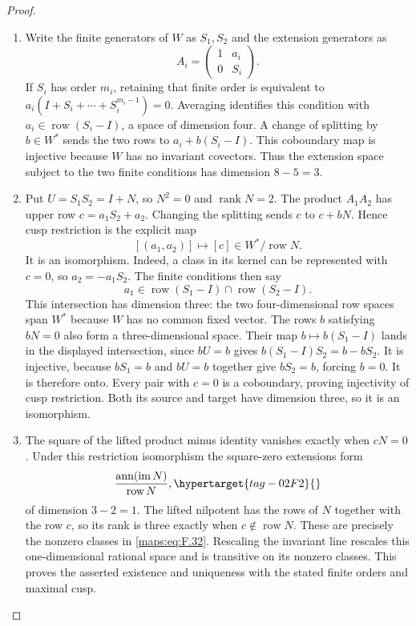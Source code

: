 \documentclass[11pt,a4paper]{article}
\numberwithin{equation}{section}
\theoremstyle{definition}
\begin{document}
\begin{proof}
\begin{enumerate}[label=\arabic*.]
\item Write the finite generators of $W$ as $S_1,S_2$ and the
extension generators as
\[
 A_i=\begin{pmatrix}1&a_i\\0&S_i\end{pmatrix}.
\]
If $S_i$ has order $m_i$, retaining that finite order is equivalent
to $a_i(I+S_i+\cdots+S_i^{m_i-1})=0$.  Averaging identifies this
condition with $a_i\in\operatorname{row}(S_i-I)$, a space of
dimension four.  A change of splitting by $b\in W^*$ sends the
two rows to $a_i+b(S_i-I)$.  This coboundary map is injective
because $W$ has no invariant covectors.  Thus the extension
space subject to the two finite conditions has dimension $8-5=3$.

\item Put $U=S_1S_2=I+N$, so $N^2=0$ and $\operatorname{rank}N=2$.
The product $A_1A_2$ has upper row $c=a_1S_2+a_2$.
Changing the splitting sends $c$ to $c+bN$.  Hence cusp restriction
is the explicit map
\[
 [(a_1,a_2)]\longmapsto[c]\in W^*/\operatorname{row}N.
\]
It is an isomorphism.  Indeed, a class in its kernel can be
represented with $c=0$, so $a_2=-a_1S_2$.  The finite conditions
then say
\[
 a_1\in\operatorname{row}(S_1-I)
              \cap\operatorname{row}(S_2-I).
\]
This intersection has dimension three: the two four-dimensional
row spaces span $W^*$ because $W$ has no common fixed vector.
The rows $b$ satisfying $bN=0$ also form a three-dimensional
space.  Their map $b\mapsto b(S_1-I)$ lands in the displayed
intersection, since $bU=b$ gives
$b(S_1-I)S_2=b-bS_2$.  It is injective, because
$bS_1=b$ and $bU=b$ together give $bS_2=b$, forcing $b=0$.
It is therefore onto.  Every pair with $c=0$ is a coboundary,
proving injectivity of cusp restriction.  Both its source and
target have dimension three, so it is an isomorphism.

\item The square of the lifted product minus identity vanishes
exactly when $cN=0$.  Under this restriction isomorphism the
square-zero extensions form
\begin{equation}
 \frac{\operatorname{ann}(\operatorname{im}N)}
      {\operatorname{row}N},
 \hypertarget{tag-02F2}{}\label{maps:eq:F.32}
\end{equation}
of dimension $3-2=1$.  The lifted nilpotent has the rows of $N$
together with the row $c$, so its rank is three exactly when
$c\notin\operatorname{row}N$.  These are precisely the nonzero
classes in \eqref{maps:eq:F.32}.  Rescaling the invariant line
rescales this one-dimensional rational space and is transitive
on its nonzero classes.  This proves the asserted existence and
uniqueness with the stated finite orders and maximal cusp.
\end{enumerate}
\end{proof}
\end{document}

